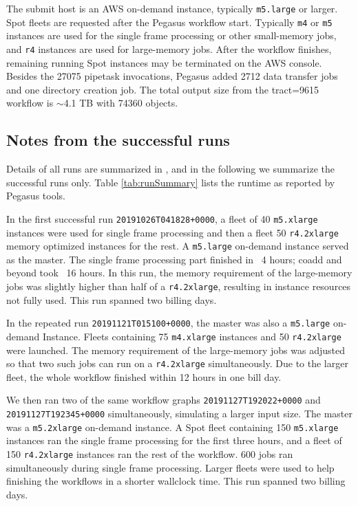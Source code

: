 The submit host is an AWS on-demand instance, typically \texttt{m5.large} or larger.
Spot fleets are requested after the Pegasus workflow start.
Typically \texttt{m4} or \texttt{m5} instances are used for the single frame processing or other small-memory jobs, and \texttt{r4} instances are used for large-memory jobs.
After the workflow finishes, remaining running Spot instances may be terminated on the AWS console.
Besides the 27075 pipetask invocations, Pegasus added 2712 data transfer jobs and one directory creation job.
The total output size from the tract=9615 workflow is $\sim$4.1 TB with 74360 objects.

\subsection{Notes from the successful runs}

Details of all runs are summarized in , and in the following we summarize the successful runs only.
Table \ref{tab:runSummary} lists the runtime as reported by Pegasus tools.



In the first successful run \texttt{20191026T041828+0000}, a fleet of 40 \texttt{m5.xlarge} instances were used for single frame processing and then a fleet 50 \texttt{r4.2xlarge} memory optimized instances for the rest.
A \texttt{m5.large} on-demand instance served as the master.
The single frame processing part finished in ~4 hours; coadd and beyond took ~16 hours.
In this run, the memory requirement of the large-memory jobs was slightly higher than half of a \texttt{r4.2xlarge}, resulting in instance resources not fully used.
This run spanned two billing days.

In the repeated run \texttt{20191121T015100+0000}, the master was also a \texttt{m5.large} on-demand Instance.
Fleets containing 75 \texttt{m4.xlarge} instances and 50 \texttt{r4.2xlarge} were launched.
The memory requirement of the large-memory jobs was adjusted so that two such jobs can run on a \texttt{r4.2xlarge} simultaneously.
Due to the larger fleet, the whole workflow finished within 12 hours in one bill day.

We then ran two of the same workflow graphs \texttt{20191127T192022+0000} and \texttt{20191127T192345+0000} simultaneously, simulating a larger input size.
The master was a \texttt{m5.2xlarge} on-demand instance.
A Spot fleet containing 150 \texttt{m5.xlarge} instances ran the single frame processing for the first three hours, and a fleet of 150 \texttt{r4.2xlarge} instances ran the rest of the workflow.
600 jobs ran simultaneously during single frame processing.
Larger fleets were used to help finishing the workflows in a shorter wallclock time.
This run spanned two billing days.

